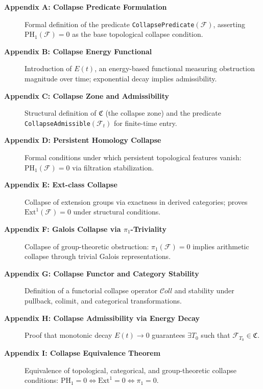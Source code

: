 \documentclass[11pt]{article}
\begin{document}
\begin{description}

  \item[\textbf{Appendix A: Collapse Predicate Formulation}]  
  Formal definition of the predicate \texttt{CollapsePredicate}$(\mathcal{F})$, asserting $\mathrm{PH}_1(\mathcal{F}) = 0$ as the base topological collapse condition.

  \item[\textbf{Appendix B: Collapse Energy Functional}]  
  Introduction of $E(t)$, an energy-based functional measuring obstruction magnitude over time; exponential decay implies admissibility.

  \item[\textbf{Appendix C: Collapse Zone and Admissibility}]  
  Structural definition of $\mathfrak{C}$ (the collapse zone) and the predicate \texttt{CollapseAdmissible}$(\mathcal{F}_t)$ for finite-time entry.

  \item[\textbf{Appendix D: Persistent Homology Collapse}]  
  Formal conditions under which persistent topological features vanish: $\mathrm{PH}_1(\mathcal{F}) = 0$ via filtration stabilization.

  \item[\textbf{Appendix E: Ext-class Collapse}]  
  Collapse of extension groups via exactness in derived categories; proves $\mathrm{Ext}^1(\mathcal{F}) = 0$ under structural conditions.

  \item[\textbf{Appendix F: Galois Collapse via $\pi_1$-Triviality}]  
  Collapse of group-theoretic obstruction: $\pi_1(\mathcal{F}) = 0$ implies arithmetic collapse through trivial Galois representations.

  \item[\textbf{Appendix G: Collapse Functor and Category Stability}]  
  Definition of a functorial collapse operator $\mathcal{C}oll$ and stability under pullback, colimit, and categorical transformations.

  \item[\textbf{Appendix H: Collapse Admissibility via Energy Decay}]  
  Proof that monotonic decay $E(t) \to 0$ guarantees $\exists T_0$ such that $\mathcal{F}_{T_0} \in \mathfrak{C}$.

  \item[\textbf{Appendix I: Collapse Equivalence Theorem}]  
  Equivalence of topological, categorical, and group-theoretic collapse conditions:  
  $\mathrm{PH}_1 = 0 \Leftrightarrow \mathrm{Ext}^1 = 0 \Leftrightarrow \pi_1 = 0$.


\end{description}
\end{document}
